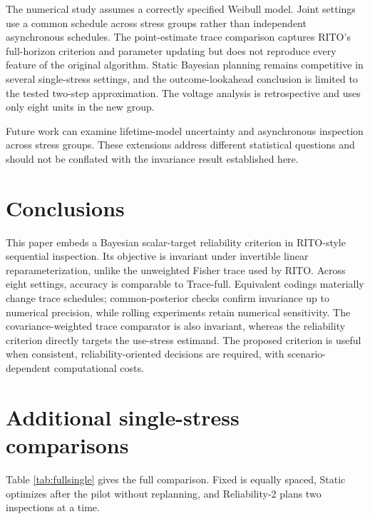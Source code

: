 \documentclass[a4paper,fleqn]{cas-sc}
\begin{document}
The numerical study assumes a correctly specified Weibull model. Joint settings use a common schedule across stress groups rather than independent asynchronous schedules. The point-estimate trace comparison captures RITO's full-horizon criterion and parameter updating but does not reproduce every feature of the original algorithm. Static Bayesian planning remains competitive in several single-stress settings, and the outcome-lookahead conclusion is limited to the tested two-step approximation. The voltage analysis is retrospective and uses only eight units in the new group.

Future work can examine lifetime-model uncertainty and asynchronous inspection across stress groups. These extensions address different statistical questions and should not be conflated with the invariance result established here.

\section{Conclusions}

This paper embeds a Bayesian scalar-target reliability criterion in RITO-style sequential inspection. Its objective is invariant under invertible linear reparameterization, unlike the unweighted Fisher trace used by RITO. Across eight settings, accuracy is comparable to Trace-full. Equivalent codings materially change trace schedules; common-posterior checks confirm invariance up to numerical precision, while rolling experiments retain numerical sensitivity. The covariance-weighted trace comparator is also invariant, whereas the reliability criterion directly targets the use-stress estimand. The proposed criterion is useful when consistent, reliability-oriented decisions are required, with scenario-dependent computational costs.

\clearpage
\appendix
\section{Additional single-stress comparisons}

Table \ref{tab:fullsingle} gives the full comparison. Fixed is equally spaced, Static optimizes after the pilot without replanning, and Reliability-2 plans two inspections at a time.

\begin{table}[pos=H]
\centering
\caption{Complete single-stress RMSE and Monte Carlo standard errors over 1000 matched replicates.}
\label{tab:fullsingle}
\resizebox{\textwidth}{!}{}
\end{table}
\end{document}
